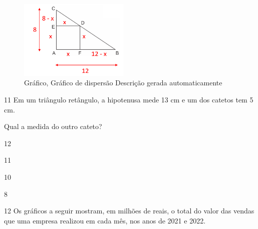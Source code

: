 {{{\begin{escolha}
{{{{{\begin{escolha}
\begin{escolha}
{\begin{q°}
{\begin{escolha}
\begin{escolha}
\begin{escolha}
\begin{escolha}
\begin{escolha}
\begin{escolha}
{\begin{figure}
\centering
\includegraphics[width=2.07292in,height=1.48748in]{./_SAEB_9_MAT/media/image268.png}
\caption{Gráfico, Gráfico de dispersão Descrição gerada automaticamente}
\end{figure}
}

\num{11} Em um triângulo retângulo, a hipotenusa mede 13 cm e um
dos catetos tem 5 cm.

Qual a medida do outro cateto?

\begin{escolha}

  \item 12

  \item 11

  \item 10

  \item 8

\end{escolha}


\num{12} Os gráficos a seguir mostram, em milhões de reais, o total do
valor das vendas que uma empresa realizou em cada mês, nos anos de 2021
e 2022.


\end{escolha}
\end{escolha}
\end{escolha}
\end{escolha}
\end{escolha}
\end{escolha}}
\end{q°}}
\end{escolha}
\end{escolha}}}}}}
\end{escolha}}}}
